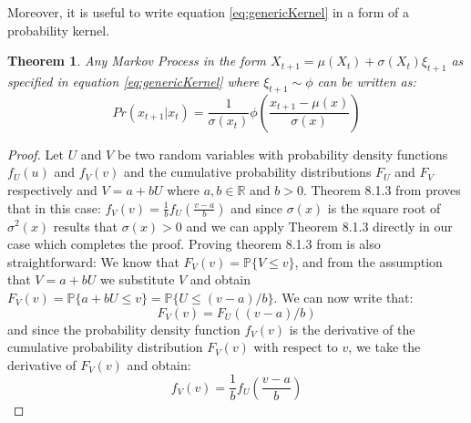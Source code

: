 \documentclass[a4paper,12pt]{article}
\newtheorem{theorem}{Theorem}[section]
\theoremstyle{definition}
\begin{document}
Moreover, it is useful to write equation \ref{eq:genericKernel} in a form of a probability kernel. 
\begin{theorem}
Any Markov Process in the form $X_{t+1} = \mu(X_t) +\sigma(X_t)\xi_{t+1}$ as specified in equation \ref{eq:genericKernel} where $\xi_{t+1} \sim \phi$ can be written as:
\begin{equation}
Pr(x_{t+1}|x_t)
= \frac{1}{\sigma(x_t)}
\phi \left( \frac{x_{t+1} - \mu(x)}{\sigma(x)} \right)
\end{equation}
\end{theorem}
\begin{proof}
Let $U$ and $V$ be two random variables with probability density functions $f_U(u)$ and $f_V(v)$ and the cumulative probability distributions  $F_U$ and $F_V$ respectively and $V = a+bU$ where $a,b \in \mathbb{R}$ and $b>0$. Theorem 8.1.3 from \cite{quantecon} proves that in this case:
$f_V(v)= \frac{1}{b} f_U \left( \frac{v - a}{b} \right)$
and since $\sigma(x)$ is the square root of $\sigma^2(x)$ results that $\sigma(x)>0$ and we can apply Theorem 8.1.3 directly in our case which completes the proof. 
Proving theorem 8.1.3 from \cite{quantecon} is also straightforward:
We know that $F_V(v) = \mathbb P\{V \leq v \}$, and from the assumption that $V = a+bU$ we substitute $V$ and obtain  $F_V(v) = \mathbb P \{ a + b U \leq v \} = \mathbb P \{ U \leq (v - a) / b \}$. We can now write that:
\begin{equation}
F_V(v) = F_U ( (v - a)/b )
\end{equation}
and since the probability density function $f_V(v)$ is the derivative of the cumulative probability distribution $F_V(v)$ with respect to $v$, we take the derivative of $F_V(v)$ and obtain:
\begin{equation}
f_V(v)
= \frac{1}{b}
f_U \left( \frac{v - a}{b} \right)
\end{equation}
\end{proof}
\end{document}
